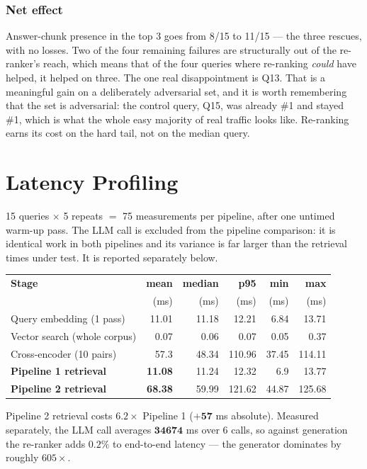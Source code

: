 \documentclass[11pt,a4paper]{article}
\begin{document}
\subsubsection*{Net effect}

Answer-chunk presence in the top 3 goes from 8/15 to 11/15 --- the three
rescues, with no losses. Two of the four remaining failures are structurally
out of the re-ranker's reach, which means that of the four queries where
re-ranking \emph{could} have helped, it helped on three. The one real
disappointment is Q13. That is a meaningful gain on a deliberately adversarial
set, and it is worth remembering that the set is adversarial: the control
query, Q15, was already \#1 and stayed \#1, which is what the whole easy
majority of real traffic looks like. Re-ranking earns its cost on the hard tail,
not on the median query.

\section{Latency Profiling}

15 queries $\times$ 5 repeats $=$ 75 measurements per pipeline, after one
untimed warm-up pass. The LLM call is excluded from the pipeline comparison:
it is identical work in both pipelines and its variance is far larger than
the retrieval times under test. It is reported separately below.

\begin{center}\begin{tabular}{lrrrrr}\toprule
\textbf{Stage} & \textbf{mean} & \textbf{median} & \textbf{p95} & \textbf{min} & \textbf{max} \\
 & (ms) & (ms) & (ms) & (ms) & (ms) \\ \midrule
Query embedding (1 pass) & 11.01 & 11.18 & 12.21 & 6.84 & 13.71 \\
Vector search (whole corpus) & 0.07 & 0.06 & 0.07 & 0.05 & 0.37 \\
Cross-encoder (10 pairs) & 57.3 & 48.34 & 110.96 & 37.45 & 114.11 \\
\midrule
\textbf{Pipeline 1 retrieval} & \textbf{11.08} & 11.24 & 12.32 & 6.9 & 13.77 \\
\textbf{Pipeline 2 retrieval} & \textbf{68.38} & 59.99 & 121.62 & 44.87 & 125.68 \\
\bottomrule\end{tabular}\end{center}

Pipeline 2 retrieval costs $\mathbf{6.2\times}$ Pipeline 1
($\mathbf{+57}$ ms absolute). Measured separately, the LLM call averages
$\mathbf{34674}$ ms over 6 calls, so against generation the re-ranker adds
$\mathbf{0.2\%}$ to end-to-end latency --- the generator dominates by
roughly $605\times$.
\end{document}
